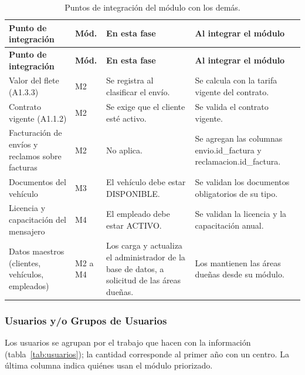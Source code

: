 {\singlespacing\small
\begin{longtable}{L{4.0cm} L{1.0cm} L{4.6cm} L{4.8cm}}
\caption{Puntos de integración del módulo con los demás.}
\label{tab:interfaces}\\
\toprule
\textbf{Punto de integración} & \textbf{Mód.} & \textbf{En esta fase} & \textbf{Al integrar el módulo} \\
\midrule
\endfirsthead
\toprule
\textbf{Punto de integración} & \textbf{Mód.} & \textbf{En esta fase} & \textbf{Al integrar el módulo} \\
\midrule
\endhead
\bottomrule
\endfoot
Valor del flete (A1.3.3) & M2 & Se registra al clasificar el envío. & Se calcula con la tarifa vigente del contrato. \\
Contrato vigente (A1.1.2) & M2 & Se exige que el cliente esté activo. & Se valida el contrato vigente. \\
Facturación de envíos y reclamos sobre facturas & M2 & No aplica. & Se agregan las columnas envio.id\_factura y reclamacion.id\_factura. \\
Documentos del vehículo & M3 & El vehículo debe estar DISPONIBLE. & Se validan los documentos obligatorios de su tipo. \\
Licencia y capacitación del mensajero & M4 & El empleado debe estar ACTIVO. & Se validan la licencia y la capacitación anual. \\
Datos maestros (clientes, vehículos, empleados) & M2 a M4 & Los carga y actualiza el administrador de la base de datos, a solicitud de las áreas dueñas. & Los mantienen las áreas dueñas desde su módulo. \\
\end{longtable}
\par}

\subsubsection{Usuarios y/o Grupos de Usuarios}
\label{sec:usuarios}

Los usuarios se agrupan por el trabajo que hacen con la información
(tabla~\ref{tab:usuarios}); la cantidad corresponde al primer año con un
centro. La última columna indica quiénes usan el módulo priorizado.

